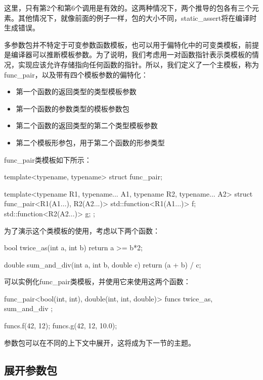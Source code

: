 这里，只有第2个和第6个调用是有效的。这两种情况下，两个推导的包各有三个元素。其他情况下，就像前面的例子一样，包的大小不同，static_assert将在编译时生成错误。

多参数包并不特定于可变参数函数模板，也可以用于偏特化中的可变类模板，前提是编译器可以推断模板参数。为了说明，我们考虑用一对函数指针表示类模板的情况，实现应该允许存储指向任何函数的指针。所以，我们定义了一个主模板，称为func_pair，以及带有四个模板参数的偏特化：

\begin{itemize}
  \item 第一个函数的返回类型的类型模板参数
  \item 第一个函数的参数类型的模板参数包
  \item 第二个函数的返回类型的第二个类型模板参数
  \item 第二个模板形参包，用于第二个函数的形参类型
\end{itemize}

func_pair类模板如下所示：

\begin{cppcode}
template<typename, typename>
struct func_pair;

template<typename R1, typename... A1,
         typename R2, typename... A2>
struct func_pair<R1(A1...), R2(A2...)>
{
	std::function<R1(A1...)> f;
	std::function<R2(A2...)> g;
};
\end{cppcode}

为了演示这个类模板的使用，考虑以下两个函数：

\begin{cppcode}
bool twice_as(int a, int b)
{
	return a >= b*2;
}

double sum_and_div(int a, int b, double c)
{
	return (a + b) / c;
}
\end{cppcode}

可以实例化func_pair类模板，并使用它来使用这两个函数：

\begin{cppcode}
func_pair<bool(int, int), double(int, int, double)> funcs{
	twice_as, sum_and_div };

funcs.f(42, 12);
funcs.g(42, 12, 10.0);
\end{cppcode}

参数包可以在不同的上下文中展开，这将成为下一节的主题。

\subsection{展开参数包}

